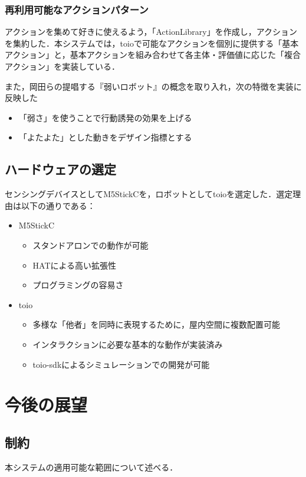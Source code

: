 \documentclass[paper=a4paper,jafontsize=9pt,head_space=15mm,gutter=20mm,
twocolumn,number_of_lines=49, line_length=26zw]{myuarticle}
\begin{document}
\subsubsection{再利用可能なアクションパターン}
アクションを集めて好きに使えるよう，「ActionLibrary」を作成し，アクションを集約した．本システムでは，toioで可能なアクションを個別に提供する「基本アクション」と，基本アクションを組み合わせて各主体・評価値に応じた「複合アクション」を実装している．

また，岡田ら\cite{岡田-2017-弱いロボ}の提唱する『弱いロボット』の概念を取り入れ，次の特徴を実装に反映した
\begin{itemize}
  \item 「弱さ」を使うことで行動誘発の効果を上げる
  \item 「よたよた」とした動きをデザイン指標とする
\end{itemize}

\subsection{ハードウェアの選定}
センシングデバイスとしてM5StickCを，ロボットとしてtoioを選定した．選定理由は以下の通りである：

\begin{itemize}
  \item M5StickC
    \begin{itemize}
      \item スタンドアロンでの動作が可能
      \item HATによる高い拡張性
      \item プログラミングの容易さ
    \end{itemize}

  \item toio
    \begin{itemize}
      \item 多様な「他者」を同時に表現するために，屋内空間に複数配置可能
      \item インタラクションに必要な基本的な動作が実装済み
      \item toio-sdkによるシミュレーションでの開発が可能
    \end{itemize}
\end{itemize}

\section{今後の展望}

\subsection{制約}
本システムの適用可能な範囲について述べる．
\end{document}
